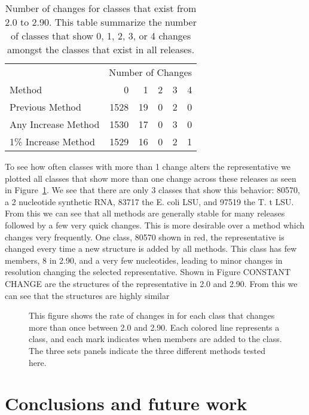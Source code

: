 \begin{table}
  \begin{tabular}{lrrrrr}
                        & \multicolumn{5}{c}{Number of Changes} \\
    Method              & 0    & 1  &  2 &  3 &  4 \\
    Previous Method     & 1528 & 19 &  0 &  2 &  0 \\
    Any Increase Method & 1530 & 17 &  0 &  3 &  0 \\
    1\% Increase Method & 1529 & 16 &  0 &  2 &  1 \\
  \end{tabular}
  \caption{Number of changes for classes that exist from 2.0 to 2.90. This table
    summarize the number of classes that show 0, 1, 2, 3, or 4 changes amongst
  the classes that exist in all releases. }
  \label{tab:rep-changes-count}
\end{table}

To see how often classes with more than 1 change alters the representative we
plotted all classes that show more than one change across these releases as seen
in Figure~\ref{fig:multi-change}. We see that there are only 3 classes that show
this behavior: 80570, a 2 nucleotide synthetic RNA, 83717 the E. coli LSU, and
97519 the T. t LSU. From this we can see that all methods are generally stable
for many releases followed by a few very quick changes. This is more
desirable over a method which changes very frequently. One class, 80570
shown in red, the representative is changed every time a new structure is
added by all methods. This class has few members, 8 in 2.90, and a very
few nucleotides, leading to minor changes in resolution changing the
selected representative. Shown in Figure CONSTANT CHANGE are the
structures of the representative in 2.0 and 2.90. From this we can see
that the structures are highly similar 

\begin{figure}
  \caption{This figure shows the rate of changes in for each class that changes
    more than once between 2.0 and 2.90. Each colored line represents a class,
    and each mark indicates when members are added to the class. The three sets
  panels indicate the three different methods tested here.}
  \label{fig:multi-change}
\end{figure}

\section{Conclusions and future work}


